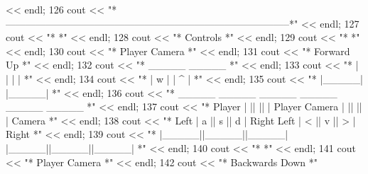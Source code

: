 \begin{DoxyCode}
      << endl;
126         cout << \textcolor{stringliteral}{"*--------------------------------------------------------------------------------------*"} 
      << endl;
127         cout << \textcolor{stringliteral}{"*                                                                                      *"} 
      << endl;
128         cout << \textcolor{stringliteral}{"*                                       Controls                                       *"} 
      << endl;
129         cout << \textcolor{stringliteral}{"*                                                                                      *"} 
      << endl;
130         cout << \textcolor{stringliteral}{"*                 Player                                      Camera                   *"} 
      << endl;
131         cout << \textcolor{stringliteral}{"*                Forward                                        Up                     *"} 
      << endl;
132         cout << \textcolor{stringliteral}{"*                 \_\_\_\_\_                                        \_\_\_\_\_                   *"} 
      << endl;
133         cout << \textcolor{stringliteral}{"*                |     |                                      |     |                  *"} 
      << endl;
134         cout << \textcolor{stringliteral}{"*                |  w  |                                      |  ^  |                  *"} 
      << endl;
135         cout << \textcolor{stringliteral}{"*                |\_\_\_\_\_|                                      |\_\_\_\_\_|                  *"} 
      << endl;
136         cout << \textcolor{stringliteral}{"*          \_\_\_\_\_  \_\_\_\_\_  \_\_\_\_\_                          \_\_\_\_\_  \_\_\_\_\_  \_\_\_\_\_            *"} 
      << endl;
137         cout << \textcolor{stringliteral}{"*  Player |     ||     ||     | Player         Camera  |     ||     ||     | Camera    *"} 
      << endl;
138         cout << \textcolor{stringliteral}{"*   Left  |  a  ||  s  ||  d  |  Right          Left   |  <  ||  v  ||  >  |  Right    *"} 
      << endl;
139         cout << \textcolor{stringliteral}{"*         |\_\_\_\_\_||\_\_\_\_\_||\_\_\_\_\_|                        |\_\_\_\_\_||\_\_\_\_\_||\_\_\_\_\_|           *"} 
      << endl;
140         cout << \textcolor{stringliteral}{"*                                                                                      *"} 
      << endl;
141         cout << \textcolor{stringliteral}{"*                 Player                                       Camera                  *"} 
      << endl;
142         cout << \textcolor{stringliteral}{"*                Backwards                                      Down                   *"} 

\end{DoxyCode}
